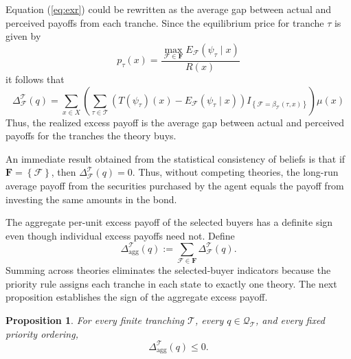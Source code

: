 \documentclass[11pt]{article}
\theoremstyle{plain}
\newtheorem{prp}{Proposition}%
\begin{document}
Equation (\ref{eq:exr}) could be rewritten as the average gap between actual and perceived payoffs from each tranche. Since the equilibrium price for tranche $\tau$ is given by
\[
p_\tau(x) =
\frac{
\max_{\mathcal{F}\in\mathbf{F}}E_\mathcal{F}
(\psi_\tau\mid x)
}
{R(x)}
\]
it follows that
\begin{equation*}
\Delta_\mathcal{F}^{\mathcal{T}}(q)
=
\sum_{x\in X}
\left(
\sum_{\tau\in\mathcal{T}}
\left(
T(\psi_\tau)(x)-
E_\mathcal{F}(\psi_\tau\mid x)
\right)
I_{\left\{\mathcal{F}=\beta_{\mathcal{T}}(\tau,x)\right\}}
\right)\mu(x)
\end{equation*}
Thus, the realized excess payoff is the average gap between actual and perceived payoffs for the tranches the theory buys.

An immediate result obtained from the statistical consistency of beliefs is that if $\mathbf{F}=\left\{\mathcal{F}\right\}$, then $\Delta_\mathcal{F}^{\mathcal{T}}(q)=0$. Thus, without competing theories, the long-run average payoff from the securities purchased by the agent equals the payoff from investing the same amounts in the bond.

The aggregate per-unit excess payoff of the selected buyers has a definite sign even though individual excess payoffs need not. Define
\begin{equation}\label{eq:aggregate-definition}
\Delta_{\mathrm{agg}}^{\mathcal{T}}(q)
:=
\sum_{\mathcal{F}\in\mathbf{F}}
\Delta_{\mathcal{F}}^{\mathcal{T}}(q).
\end{equation}
Summing across theories eliminates the selected-buyer indicators because the priority rule assigns each tranche in each state to exactly one theory. The next proposition establishes the sign of the aggregate excess payoff.

\begin{prp}\label{prp:aggregate-return}
For every finite tranching $\mathcal{T}$, every $q\in\mathcal{Q}_{\mathcal{T}}$, and every fixed priority ordering,
\begin{equation}\label{eq:aggregate-sign}
\Delta_{\mathrm{agg}}^{\mathcal{T}}(q)
\leq0.
\end{equation}
\end{prp}
\end{document}
